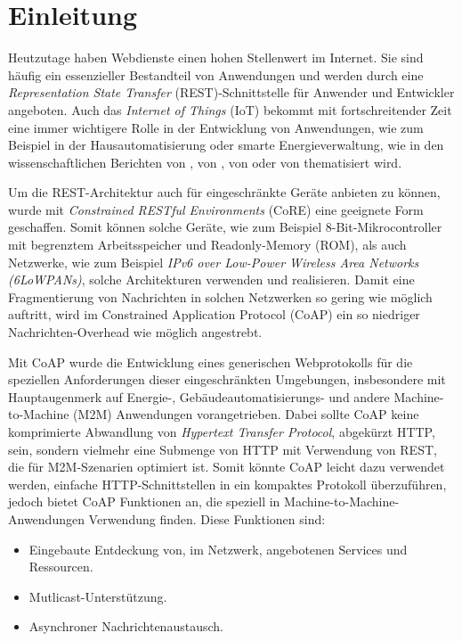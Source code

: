 \section{Einleitung}
\label{sec:einleitung}

Heutzutage haben Webdienste einen hohen Stellenwert im Internet. Sie sind häufig ein essenzieller Bestandteil von Anwendungen und werden durch eine \textit{Representation State Transfer} (REST)-Schnittstelle für Anwender und Entwickler angeboten. Auch das \textit{Internet of Things} (IoT) bekommt mit fortschreitender Zeit eine immer wichtigere Rolle in der Entwicklung von Anwendungen, wie zum Beispiel in der Hausautomatisierung oder smarte Energieverwaltung, wie in den wissenschaftlichen Berichten  von \citeauthor{HomeAutomationUsingCoAP} \autocite{HomeAutomationUsingCoAP},  von \citeauthor{okur2014study} \autocite{okur2014study},  von \citeauthor{TinyCoAP} \autocite{TinyCoAP} oder  von \citeauthor{TransportLogisticUsingCoAP} \autocite{TransportLogisticUsingCoAP} thematisiert wird.

Um die REST-Architektur auch für eingeschränkte Geräte anbieten zu können, wurde mit \textit{Constrained RESTful Environments} (CoRE) eine geeignete Form geschaffen. Somit können solche Geräte, wie zum Beispiel 8-Bit-Mikrocontroller mit begrenztem Arbeitsspeicher und Readonly-Memory (ROM), als auch Netzwerke, wie zum Beispiel \textit{IPv6 over Low-Power Wireless Area Networks (6LoWPANs)}, solche Architekturen verwenden und realisieren. Damit eine Fragmentierung von Nachrichten in solchen Netzwerken so gering wie möglich auftritt, wird im Constrained Application Protocol (CoAP) ein so niedriger Nachrichten-Overhead wie möglich angestrebt.

Mit CoAP wurde die Entwicklung eines generischen Webprotokolls für die speziellen Anforderungen dieser eingeschränkten Umgebungen, insbesondere mit Hauptaugenmerk auf Energie-, Gebäudeautomatisierungs- und andere Machine-to-Machine (M2M) Anwendungen vorangetrieben. Dabei sollte CoAP keine komprimierte Abwandlung von \textit{Hypertext Transfer Protocol}, abgekürzt HTTP, sein, sondern vielmehr eine Submenge von HTTP mit Verwendung von REST, die für M2M-Szenarien optimiert ist. Somit könnte CoAP leicht dazu verwendet werden, einfache HTTP-Schnittstellen in ein kompaktes Protokoll überzuführen, jedoch bietet CoAP Funktionen an, die speziell in Machine-to-Machine-Anwendungen Verwendung finden. Diese Funktionen sind:
\begin{itemize}
    \item Eingebaute Entdeckung von, im Netzwerk, angebotenen Services und Ressourcen.
    \item Mutlicast-Unterstützung.
    \item Asynchroner Nachrichtenaustausch.
\end{itemize}

